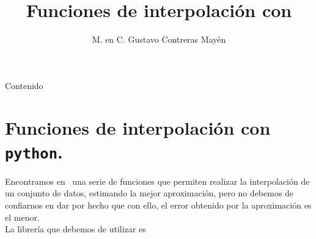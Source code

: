 



\title{Funciones de interpolación con \python}
\author{M. en C. Gustavo Contreras Mayén}

\maketitle
\fontsize{14}{14}\selectfont
{}
\begin{frame}{Contenido}
\tableofcontents[pausesections]
\end{frame}
\section{Funciones de interpolación con \texttt{python}.}
\begin{frame}
Encontramos en \python\ una serie de funciones que permiten realizar la interpolación de un conjunto de datos, estimando la mejor aproximación, pero no debemos de confiarnos en dar por hecho que con ello, el error obtenido por la aproximación es el menor.
\\
\bigskip
La librería que debemos de utilizar es 
\end{frame}
